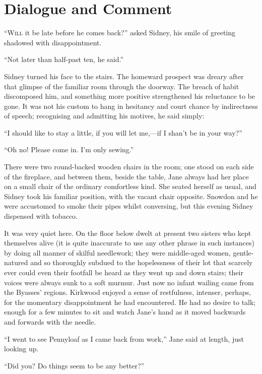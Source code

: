 \chapter{Dialogue and Comment}

\textsc{``Will} it be late before he comes back?'' asked Sidney, his
smile of greeting shadowed with disappointment.

``Not later than half-past ten, he said.''

Sidney turned his face to the stairs. The homeward prospect was dreary
after that glimpse of the familiar room through the doorway. The breach
of habit discomposed him, and something more positive strengthened his
reluctance to be gone. It was not his custom to hang in hesitancy and
court chance by indirectness of speech; recognising and admitting his
motives, he said simply:

``I should like to stay a little, if you will let me,---if I shan't be
in your way?''

{\protect\hypertarget{43}{}{}}``Oh no! Please come in. I'm only
sewing.''

There were two round-backed wooden chairs in the room; one stood on each
side of the fireplace, and between them, beside the table, Jane always
had her place on a small chair of the ordinary comfortless kind. She
seated herself as usual, and Sidney took his familiar position, with the
vacant chair opposite. Snowdon and he were accustomed to smoke their
pipes whilst conversing, but this evening Sidney dispensed with tobacco.

It was very quiet here. On the floor below dwelt at present two sisters
who kept themselves alive (it is quite inaccurate to use any other
phrase in such instances) by doing all manner of skilful needlework;
they were middle-aged women, gentle-natured and so thoroughly subdued to
the hopelessness of their lot that scarcely ever could even their
footfall be heard as they went up and down stairs; their voices were
always sunk to a soft murmur. Just now no infant wailing came from the
Byasses' regions. Kirkwood {\protect\hypertarget{44}{}{}}enjoyed a sense
of restfulness, intenser, perhaps, for the momentary disappointment he
had encountered. He had no desire to talk; enough for a few minutes to
sit and watch Jane's hand as it moved backwards and forwards with the
needle.

``I went to see Pennyloaf as I came back from work,'' Jane said at
length, just looking up.

``Did you? Do things seem to be any better?''

